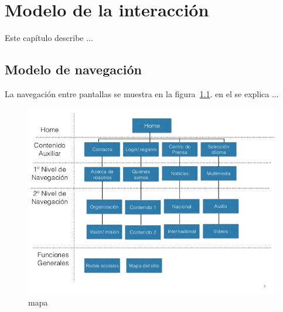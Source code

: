 \chapter{Modelo de la interacción}
\label{cap:modInteraccion}

Este capítulo describe ...

\section{Modelo de navegación}

La navegación entre pantallas se muestra en la figura~\ref{fig:mapa}. en el se explica ...\\

\begin{figure}[htbp]
	\begin{center}
		\includegraphics[width=.7\textwidth]{images/mapa}
		\caption{mapa}
		\label{fig:mapa}
	\end{center}
\end{figure}



